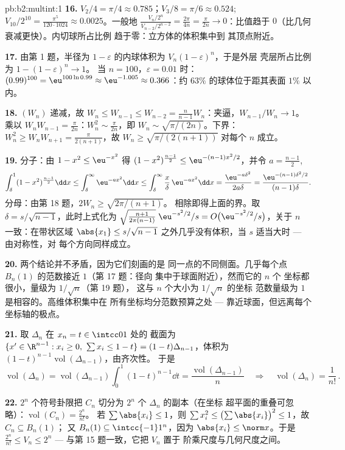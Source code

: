 \begin{solution}{pb:b2:multint:1}
\textbf{16.} $V_2/4 = \pi/4 \approx 0.785$；$V_3/8 = \pi/6
\approx 0.524$; $V_{10}/2^{10} = \frac{\pi^5}{120\cdot1024}
\approx 0.0025$。一般地 $\frac{V_n/2^n}{V_{n-2}/2^{n-2}}
= \frac{2\pi}{4n} = \frac{\pi}{2n} \to 0$：比值趋于
$0$（比几何衰减更快）。内切球所占比例
趋于零：立方体的体积集中到
其顶点附近。

\textbf{17.} 由第 1 题，半径为 $1 -
\varepsilon$ 的内球体积为 $V_n(1-\varepsilon)^n$，于是外层
壳层所占比例为 $1 - (1 - \varepsilon)^n \to 1$。
当 $n = 100$，$\varepsilon = 0.01$ 时：$(0.99)^{100} =
\eu^{100\ln0.99} \approx \eu^{-1.005} \approx 0.366$：约
$63\%$ 的球体位于距其表面 $1\%$ 以内。

\textbf{18.} $(W_n)$ 递减，故 $W_n \leq W_{n-1} \leq
W_{n-2} = \frac{n}{n-1}W_n$：夹逼，$W_{n-1}/W_n \to 1$。
乘以 $W_nW_{n-1} = \frac\pi{2n}$：$W_n^2 \sim
\frac\pi{2n}$，即 $W_n \sim \sqrt{\pi/(2n)}$。下界：
$W_n^2 \geq W_nW_{n+1} = \frac{\pi}{2(n+1)}$，故 $W_n \geq
\sqrt{\pi/(2(n+1))}$ 对每个 $n$ 成立。

\textbf{19.} 分子：由 $1 - x^2 \leq \eu^{-x^2}$ 得 $(1 -
x^2)^{\frac{n-1}2} \leq \eu^{-(n-1)x^2/2}$，并令 $a =
\frac{n-1}2$,
\[
\int_\delta^1(1 - x^2)^{\frac{n-1}2}\dd x
\leq \int_\delta^\infty\eu^{-ax^2}\dd x
\leq \int_\delta^\infty\frac x\delta\,\eu^{-ax^2}\dd x
= \frac{\eu^{-a\delta^2}}{2a\delta}
= \frac{\eu^{-(n-1)\delta^2/2}}{(n-1)\delta}.
\]
分母：由第 18 题，$2W_n \geq \sqrt{2\pi/(n+1)}$。
相除即得上面的界。取 $\delta =
s/\sqrt{n-1}$，此时上式化为
$\sqrt{\tfrac{n+1}{2\pi(n-1)}}\;\eu^{-s^2/2}/s = O\bigl(
\eu^{-s^2/2}/s\bigr)$，关于 $n$ 一致：在带状区域
$\abs{x_1} \leq s/\sqrt{n-1}$ 之外几乎没有体积，当
$s$ 适当大时 --- 由对称性，对
每个方向同样成立。

\textbf{20.} 两个结论并不矛盾，因为它们刻画的是
同一点的不同侧面。几乎每个点
$B_n(1)$ 的范数接近 $1$（第 17 题：径向
集中于球面附近），然而它的 $n$ 个
坐标都很小，量级为 $1/\sqrt n$（第 19 题），
这与 $n$ 个大小为 $1/\sqrt n$ 的坐标
范数量级为 $1$ 是相容的。高维体积集中在
所有坐标均分范数预算之处 ---
靠近球面，但远离每个坐标轴的极点。

\textbf{21.} 取 $\Delta_n$ 在 $x_n = t \in \intcc01$ 处的
截面为 $\{x' \in \R^{n-1} : x_i \geq 0,\ \sum x_i \leq 1 -
t\} = (1-t)\Delta_{n-1}$，体积为
$(1-t)^{n-1}\operatorname{vol}(\Delta_{n-1})$，由齐次性。
于是
\[
\operatorname{vol}(\Delta_n) =
\operatorname{vol}(\Delta_{n-1})\int_0^1(1 - t)^{n-1}\dd t =
\frac{\operatorname{vol}(\Delta_{n-1})}{n}
\quad\Longrightarrow\quad
\operatorname{vol}(\Delta_n) = \frac1{n!}\,.
\]

\textbf{22.} $2^n$ 个符号卦限把 $C_n$ 切分为 $2^n$
个 $\Delta_n$ 的副本（在坐标
超平面的重叠可忽略）：$\operatorname{vol}(C_n) = \frac{2^n}{n!}$。
若 $\sum\abs{x_i} \leq 1$，则 $\sum x_i^2 \leq
\bigl(\sum\abs{x_i}\bigr)^2 \leq 1$，故 $C_n \subseteq B_n(1)$；
又 $B_n(1) \subseteq \intcc{-1}1^n$，因为 $\abs{x_i} \leq
\norm x$。于是 $\frac{2^n}{n!} \leq V_n \leq 2^n$ ---
与第 15 题一致，它把 $V_n$ 置于
阶乘尺度与几何尺度之间。


\end{solution}
